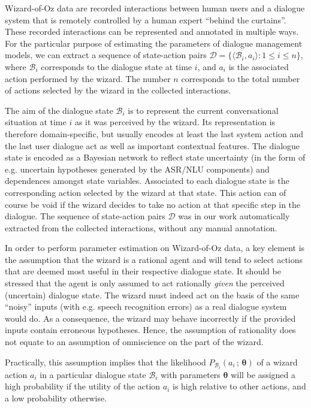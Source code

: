 Wizard-of-Oz data are recorded interactions between human users and a dialogue system that is remotely controlled by a human expert ``behind the curtains''. These recorded interactions can be represented and annotated in multiple ways.  For the particular purpose of estimating the parameters of dialogue management models, we can extract a sequence of state-action pairs $\mathcal{D} = \{\langle \mathcal{B}_i, a_i \rangle : 1 \leq i \leq n\}$, where $\mathcal{B}_i$ corresponds to the dialogue state at time $i$, and $a_i$ is the associated action performed by the wizard.  The number $n$ corresponds to the total number of actions selected by the wizard in the collected interactions. 

The aim of the dialogue state $\mathcal{B}_i$ is to represent the current conversational situation at time $i$ as it was perceived by the wizard.  Its representation is therefore domain-specific, but usually encodes at least the last system action and the last user dialogue act as well as important contextual features.  The dialogue state is encoded as a Bayesian network to reflect state uncertainty (in the form of e.g. uncertain hypotheses generated by the ASR/NLU components) and dependences amongst state variables. Associated to each dialogue state is the corresponding action selected by the wizard at that state. This action can of course be void if the wizard decides to take no action at that specific step in the dialogue. The sequence of state-action pairs $\mathcal{D}$ was in our work automatically extracted from the collected interactions, without any manual annotation.  

In order to perform parameter estimation on Wizard-of-Oz data, a key element is the assumption that the wizard is a rational agent and will tend to select actions that are deemed most useful in their respective dialogue state. It should be stressed that the agent is only assumed to act rationally \textit{given} the perceived (uncertain) dialogue state. The wizard must indeed act on the basis of the same ``noisy'' inputs (with e.g. speech recognition errors) as a real dialogue system would do.  As a consequence, the wizard may behave incorrectly if the provided inputs contain erroneous hypotheses. Hence, the assumption of rationality does not equate to an assumption of omniscience on the part of the wizard. 

Practically, this assumption implies that the likelihood $P_{\mathcal{B}_i}(a_i \, ; \, \boldsymbol\theta)$ of a wizard action $a_i$ in a particular dialogue state $\mathcal{B}_i$ with parameters $\boldsymbol\theta$ will be assigned a high probability if the utility of the action $a_i$ is high relative to other actions, and a low probability otherwise.  

